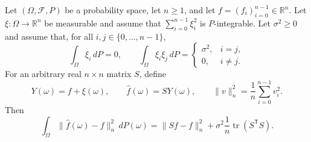 \begin{theorem}
Let $(\Omega,\mathcal F,P)$ be a probability space, let $n\geq 1$, and let
$f=(f_i)_{i=0}^{n-1}\in\mathbb R^n$.  Let
$\xi:\Omega\to\mathbb R^n$ be measurable and assume that
$\sum_{i=0}^{n-1}\xi_i^2$ is $P$-integrable.  Let $\sigma^2\geq0$ and assume
that, for all $i,j\in\{0,\ldots,n-1\}$,
\[
  \int_\Omega \xi_i\,dP=0,
  \qquad
  \int_\Omega \xi_i\xi_j\,dP=
  \begin{cases}\sigma^2,&i=j,\\0,&i\ne j.\end{cases}
\]
For an arbitrary real $n\times n$ matrix $S$, define
\[
  Y(\omega)=f+\xi(\omega),
  \qquad \widehat f(\omega)=S Y(\omega),
  \qquad \|v\|_n^2=\frac1n\sum_{i=0}^{n-1}v_i^2.
\]
Then
\[
  \int_\Omega \|\widehat f(\omega)-f\|_n^2\,dP(\omega)
  =\|Sf-f\|_n^2+\sigma^2\frac1n
    \operatorname{tr}(S^{\mathsf T}S).
\]
\end{theorem}

